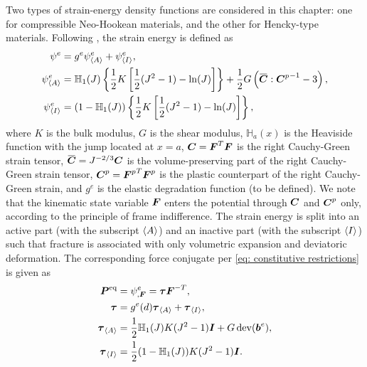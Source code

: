 Two types of strain-energy density functions are considered in this chapter: one for compressible Neo-Hookean materials, and the other for Hencky-type materials.
Following \cite{borden2016phase,ambati2016phase}, the strain energy is defined as
\begin{subequations}
  \begin{align}
    \psi^e               & =  g^e \psi^e_\activepart + \psi^e_\inactivepart,                                                                                                          \\
    \psi^e_\activepart   & = \mathbb{H}_1(J)\left\{ \dfrac{1}{2}K\left[ \dfrac{1}{2}(J^2-1) - \ln(J) \right] \right\} + \dfrac{1}{2}G\left( \overbar{\bfC}:{\bfC^p}^{-1} - 3 \right), \\
    \psi^e_\inactivepart & = \left( 1-\mathbb{H}_1(J) \right) \left\{ \dfrac{1}{2}K\left[ \dfrac{1}{2}(J^2-1) - \ln(J) \right] \right\},
  \end{align}
\end{subequations}
where $K$ is the bulk modulus, $G$ is the shear modulus, $\mathbb{H}_a(x)$ is the Heaviside function with the jump located at $x = a$, $\boldsymbol{C} = \boldsymbol{F}^T \boldsymbol{F}$ is the right Cauchy-Green strain tensor, $\overbar{\bfC} = J^{-2/3}\bfC$ is the volume-preserving part of the right Cauchy-Green strain tensor, $\boldsymbol{C}^p = {\boldsymbol{F}^p}^T \boldsymbol{F}^p$ is the plastic counterpart of the right Cauchy-Green strain, and $g^e$ is the elastic degradation function (to be defined). We note that the kinematic state variable $\boldsymbol{F}$ enters the potential through $\boldsymbol{C}$ and $\boldsymbol{C}^p$ only, according to the principle of frame indifference.
The strain energy is split into an active part (with the subscript ${\left< A \right>}$) and an inactive part (with the subscript ${\left< I \right>}$) such that fracture is associated with only volumetric expansion and deviatoric deformation. The corresponding force conjugate per \eqref{eq: constitutive restrictions} is given as
\begin{subequations}
  \begin{align}
    \boldsymbol{P}^\text{eq}          & = \psi^e_{, \boldsymbol{F}} = \boldsymbol{\tau}\boldsymbol{F}^{-T},                \\
    \boldsymbol{\tau}               & = g^e(d)\boldsymbol{\tau}_{\left< A \right>} + \boldsymbol{\tau}_{\left< I \right>},       \\
    \boldsymbol{\tau}_{\left< A \right>}   & = \dfrac{1}{2}\mathbb{H}_1(J)K(J^2-1)\boldsymbol{I} + G\operatorname{dev}(\boldsymbol{b}^e), \\
    \boldsymbol{\tau}_{\left< I \right>} & = \dfrac{1}{2}(1-\mathbb{H}_1(J))K(J^2-1)\boldsymbol{I}.
  \end{align}
\end{subequations}

